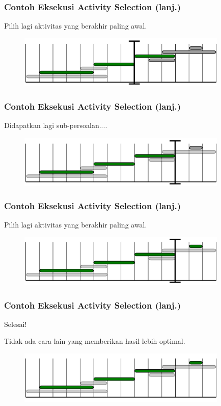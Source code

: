 \begin{frame}
  \frametitle{Contoh Eksekusi Activity Selection (lanj.)}
  Pilih lagi aktivitas yang berakhir paling awal.
  \begin{figure}
    \includegraphics[width=10cm]{asset/activity-selection-algo-6.pdf}
  \end{figure}
\end{frame}

\begin{frame}
  \frametitle{Contoh Eksekusi Activity Selection (lanj.)}
  Didapatkan lagi sub-persoalan....
  \begin{figure}
    \includegraphics[width=10cm]{asset/activity-selection-algo-7.pdf}
  \end{figure}
\end{frame}

\begin{frame}
  \frametitle{Contoh Eksekusi Activity Selection (lanj.)}
  Pilih lagi aktivitas yang berakhir paling awal.
  \begin{figure}
    \includegraphics[width=10cm]{asset/activity-selection-algo-8.pdf}
  \end{figure}
\end{frame}

\begin{frame}
  \frametitle{Contoh Eksekusi Activity Selection (lanj.)}
  Selesai!

  Tidak ada cara lain yang memberikan hasil lebih optimal.
  \begin{figure}
    \includegraphics[width=10cm]{asset/activity-selection-algo-9.pdf}
  \end{figure}
\end{frame}

